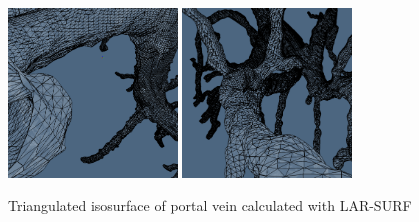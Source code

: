 \documentclass[11pt, oneside]{amsart}   	%
\begin{document}





\begin{figure}
\centering
\includegraphics[width=0.4\textwidth]{figs/porta_smoothing_1.png} 
\vspace{0.05\textwidth}
\includegraphics[width=0.4\textwidth]{figs/porta_smoothing_2.png} 
\caption{Triangulated isosurface of portal vein calculated with LAR-SURF}
\label{fig:example_porta}
\end{figure}
\end{document}
